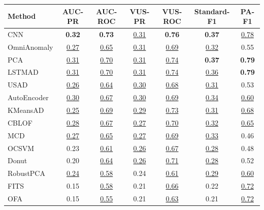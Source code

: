 \documentclass[border=2pt]{standalone}
\begin{document}
\renewcommand{\arraystretch}{1.05}
\setlength{\tabcolsep}{6pt}
\small

\begin{tabular}{l|cccccc}
\toprule
\textbf{Method} & \textbf{AUC-PR} & \textbf{AUC-ROC} & \textbf{VUS-PR} & \textbf{VUS-ROC} & \textbf{Standard-F1} & \textbf{PA-F1} \\
\midrule
CNN                    & \textbf{0.32} & \textbf{0.73} & \underline{0.31} & \textbf{0.76} & \textbf{0.37} & \underline{0.78} \\
OmniAnomaly            & \underline{0.27} & \underline{0.65} & \underline{0.31} & \underline{0.69} & \underline{0.32} & 0.55 \\
PCA                    & \underline{0.31} & \underline{0.70} & \underline{0.31} & \underline{0.74} & \textbf{0.37} & \textbf{0.79} \\
LSTMAD                 & \underline{0.31} & \underline{0.70} & \underline{0.31} & \underline{0.74} & \underline{0.36} & \textbf{0.79} \\
USAD                   & \underline{0.26} & \underline{0.64} & \underline{0.30} & \underline{0.68} & \underline{0.31} & 0.53 \\
AutoEncoder            & \underline{0.30} & \underline{0.67} & \underline{0.30} & \underline{0.69} & \underline{0.34} & \underline{0.60} \\
KMeansAD               & \underline{0.25} & \underline{0.69} & \underline{0.29} & \underline{0.73} & \underline{0.31} & \underline{0.68} \\
CBLOF                  & \underline{0.28} & \underline{0.67} & \underline{0.27} & \underline{0.70} & \underline{0.32} & \underline{0.65} \\
MCD                    & \underline{0.27} & \underline{0.65} & \underline{0.27} & \underline{0.69} & \underline{0.33} & 0.46 \\
OCSVM                  & 0.23 & \underline{0.61} & \underline{0.26} & \underline{0.67} & \underline{0.28} & 0.48 \\
Donut                  & 0.20 & \underline{0.64} & \underline{0.26} & \underline{0.71} & \underline{0.28} & 0.52 \\
RobustPCA              & \underline{0.24} & \underline{0.58} & 0.24 & \underline{0.61} & \underline{0.29} & \underline{0.60} \\
FITS                   & 0.15 & \underline{0.58} & 0.21 & \underline{0.66} & 0.22 & \underline{0.72} \\
OFA                    & 0.15 & \underline{0.55} & 0.21 & \underline{0.63} & 0.21 & \underline{0.72} \\

\end{tabular}
\end{document}

